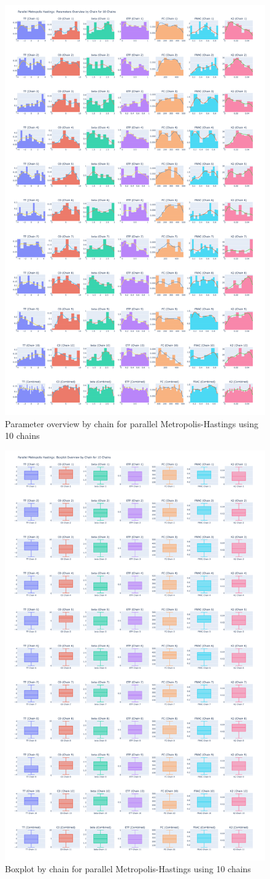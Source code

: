 \begin{figure}[H]
    \centering
    \includegraphics[width=.6\textwidth]{figures/parallel_mh/param_overview_10.png}
    \captionsetup{width=.8\textwidth}
    \caption{Parameter overview by chain for parallel Metropolis-Hastings using 10 chains}
    \label{fig:enter-label}
\end{figure}

\begin{figure}[H]
    \centering
    \includegraphics[width=.6\textwidth]{figures/parallel_mh/boxplot_10.png}
    \captionsetup{width=.8\textwidth}
    \caption{Boxplot by chain for parallel Metropolis-Hastings using 10 chains}
    \label{fig:enter-label}
\end{figure}

